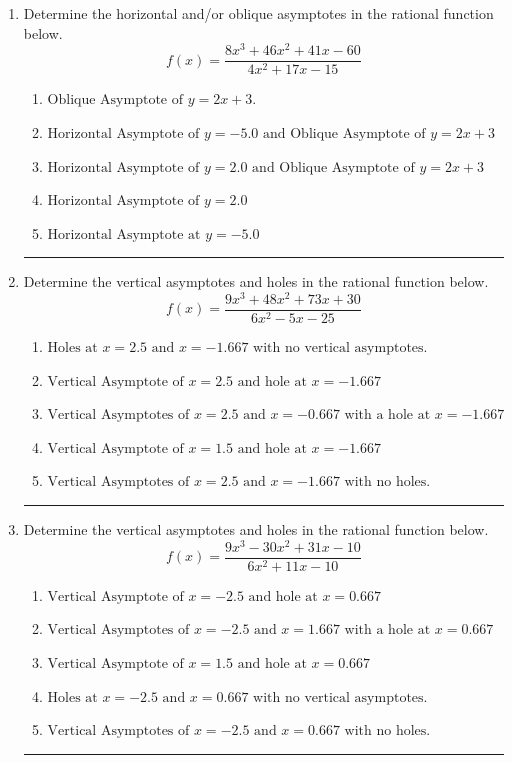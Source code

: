 \documentclass[14pt]{extbook}
\newcommand{\litem}[1]{\item#1\hspace*{-1cm}\rule{\textwidth}{0.4pt}}
\begin{document}
\begin{enumerate}
{\begin{enumerate}[label=\Alph*.]
\end{enumerate} }
\litem{
Determine the horizontal and/or oblique asymptotes in the rational function below.\[ f(x) = \frac{8x^{3} +46 x^{2} +41 x -60}{4x^{2} +17 x -15} \]\begin{enumerate}[label=\Alph*.]
\item \( \text{Oblique Asymptote of } y = 2x + 3. \)
\item \( \text{Horizontal Asymptote of } y = -5.0 \text{ and Oblique Asymptote of } y = 2x + 3 \)
\item \( \text{Horizontal Asymptote of } y = 2.0 \text{ and Oblique Asymptote of } y = 2x + 3 \)
\item \( \text{Horizontal Asymptote of } y = 2.0  \)
\item \( \text{Horizontal Asymptote at } y = -5.0 \)

\end{enumerate} }
\litem{
Determine the vertical asymptotes and holes in the rational function below.\[ f(x) = \frac{9x^{3} +48 x^{2} +73 x + 30}{6x^{2} -5 x -25} \]\begin{enumerate}[label=\Alph*.]
\item \( \text{Holes at } x = 2.5 \text{ and } x = -1.667 \text{ with no vertical asymptotes.} \)
\item \( \text{Vertical Asymptote of } x = 2.5 \text{ and hole at } x = -1.667 \)
\item \( \text{Vertical Asymptotes of } x = 2.5 \text{ and } x = -0.667 \text{ with a hole at } x = -1.667 \)
\item \( \text{Vertical Asymptote of } x = 1.5 \text{ and hole at } x = -1.667 \)
\item \( \text{Vertical Asymptotes of } x = 2.5 \text{ and } x = -1.667 \text{ with no holes.} \)

\end{enumerate} }
\litem{
Determine the vertical asymptotes and holes in the rational function below.\[ f(x) = \frac{9x^{3} -30 x^{2} +31 x -10}{6x^{2} +11 x -10} \]\begin{enumerate}[label=\Alph*.]
\item \( \text{Vertical Asymptote of } x = -2.5 \text{ and hole at } x = 0.667 \)
\item \( \text{Vertical Asymptotes of } x = -2.5 \text{ and } x = 1.667 \text{ with a hole at } x = 0.667 \)
\item \( \text{Vertical Asymptote of } x = 1.5 \text{ and hole at } x = 0.667 \)
\item \( \text{Holes at } x = -2.5 \text{ and } x = 0.667 \text{ with no vertical asymptotes.} \)
\item \( \text{Vertical Asymptotes of } x = -2.5 \text{ and } x = 0.667 \text{ with no holes.} \)


\end{enumerate}}
\end{enumerate}
\end{document}
